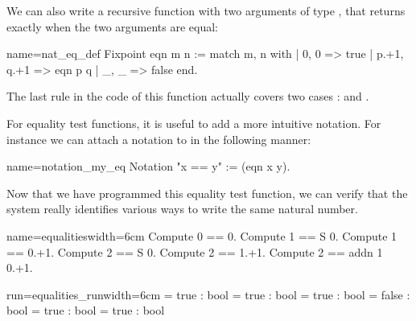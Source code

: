 


We can also write a recursive function with two arguments of
type , that returns  exactly when the two arguments are
equal:

\begin{coq}{name=nat_eq_def}{}
Fixpoint eqn m n :=
  match m, n with
  | 0, 0 => true
  | p.+1, q.+1 => eqn p q
  | _, _ => false
  end.
\end{coq}

The last rule in the code of this function actually covers two cases :
 and .

For equality test functions, it is useful to add a more intuitive
notation.  For instance we can attach a notation to  in
the following manner:

\begin{coq}{name=notation_my_eq}{}
Notation "x == y" := (eqn x y).
\end{coq}

Now
that we have programmed this equality test function, we can verify
that the \Coq{} system really identifies various ways to write the same
natural number.

\begin{coq-left}{name=equalities}{width=6cm}
Compute 0 == 0.
Compute 1 == S 0.
Compute 1 == 0.+1.
Compute 2 == S 0.
Compute 2 == 1.+1.
Compute 2 == addn 1 0.+1.
\end{coq-left}
\begin{coqout-right}{run=equalities_run}{width=6cm}
= true : bool
= true : bool
= true : bool
= false : bool
= true : bool
= true : bool
\end{coqout-right}

